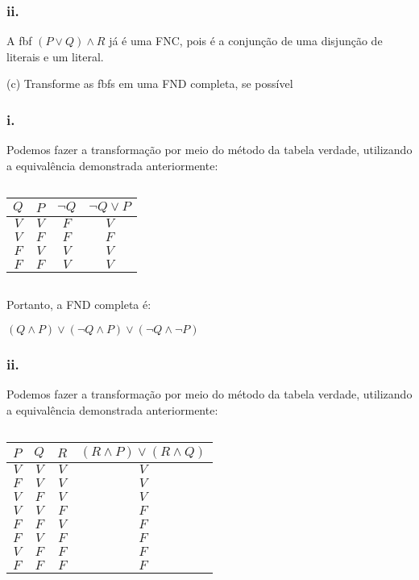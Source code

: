 \subsubsection*{ii.}
A fbf $(P \lor Q) \land R$ já é uma FNC, pois é a conjunção de uma disjunção de literais e um literal.

\newpage

\noindent
(c) Transforme as fbfs em uma FND completa, se possível

\subsubsection*{i.}
Podemos fazer a transformação por meio do método da tabela verdade, utilizando a equivalência demonstrada anteriormente:


$ \ $


\begin{tabular}{|c|c|c|c|}
	\hline
	$Q$ & $P$ & $\lnot Q$ & $\lnot Q \lor P$ \\
	\hline
	$V$ & $V$ & $F$       & $V$              \\
	\hline
	$V$ & $F$ & $F$       & $F$              \\
	\hline
	$F$ & $V$ & $V$       & $V$              \\
	\hline
	$F$ & $F$ & $V$       & $V$              \\
	\hline
\end{tabular}


$ \ $


Portanto, a FND completa é:


$(Q \land P) \lor (\lnot Q \land P) \lor (\lnot Q \land \lnot P)$
\subsubsection*{ii.}
Podemos fazer a transformação por meio do método da tabela verdade, utilizando a equivalência demonstrada anteriormente:


$ \ $


\begin{tabular}{|c|c|c|c|}
	\hline
	$P$ & $Q$ & $R$ & $(R \land P) \lor (R \land Q)$ \\
	\hline
	$V$ & $V$ & $V$ & $V$                            \\
	\hline
	$F$ & $V$ & $V$ & $V$                            \\
	\hline
	$V$ & $F$ & $V$ & $V$                            \\
	\hline
	$V$ & $V$ & $F$ & $F$                            \\
	\hline
	$F$ & $F$ & $V$ & $F$                            \\
	\hline
	$F$ & $V$ & $F$ & $F$                            \\
	\hline
	$V$ & $F$ & $F$ & $F$                            \\
	\hline
	$F$ & $F$ & $F$ & $F$                            \\
	\hline
\end{tabular}


